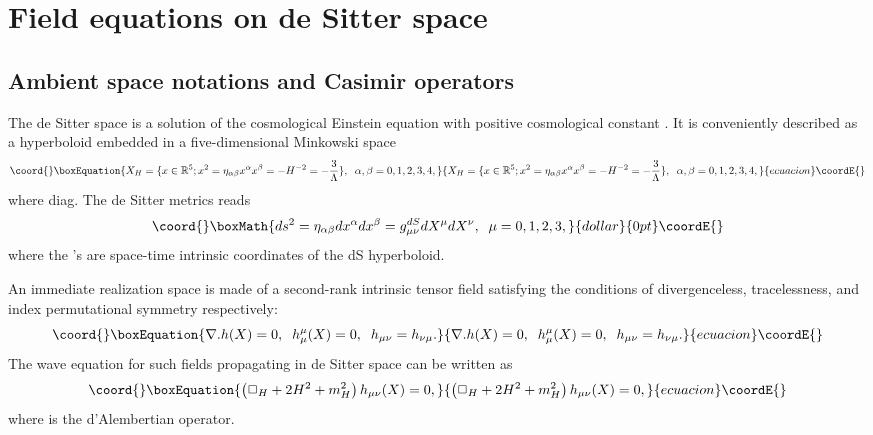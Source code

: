 \documentclass[a4paper,11pt,showpacs,preprintnumbers]{revtex4}
\def\setR{\mathbb{R}}
\begin{document}
\section{Field equations on de Sitter space}
\subsection{Ambient space notations and Casimir operators}
The de Sitter space is a solution of the cosmological Einstein
equation with positive cosmological constant \myHighlight{$\Lambda$}\coordHE{}. It is
conveniently described as a hyperboloid embedded in a
five-dimensional Minkowski space
\begin{equation}\coord{}\boxEquation{
X_H=\{x \in \setR^5 ;x^2=\eta_{\alpha\beta} x^\alpha x^\beta
=-H^{-2}=-\frac{3}{\Lambda}\},\;\;\alpha,\beta=0,1,2,3,4,
}{
X_H=\{x \in \setR^5 ;x^2=\eta_{\alpha\beta} x^\alpha x^\beta
=-H^{-2}=-\frac{3}{\Lambda}\},\;\;\alpha,\beta=0,1,2,3,4,
}{ecuacion}\coordE{}\end{equation}
where \myHighlight{$\eta_{\alpha\beta}=$}\coordHE{} diag\coordHE{}. The de Sitter
metrics reads
$$\coord{}\boxMath{ds^2=\eta_{\alpha\beta}dx^{\alpha}dx^{\beta}=g_{\mu\nu}^{dS}dX^{\mu}dX^{\nu},\;\;\mu=0,1,2,3,}{dollar}{0pt}\coordE{}$$
where the \coordHE{}'s are  \coordHE{} space-time intrinsic coordinates of
the dS hyperboloid.

An immediate  realization space is made of a second-rank intrinsic
tensor field \coordHE{} satisfying the conditions of
divergenceless, tracelessness, and index permutational symmetry
respectively:
\begin{equation}\coord{}\boxEquation{
\nabla.h(X)=0,\;\;h_{\mu}^{\mu}(X)=0,\;\;h_{\mu\nu}=h_{\nu\mu}.
\label{eq:con1}
}{
\nabla.h(X)=0,\;\;h_{\mu}^{\mu}(X)=0,\;\;h_{\mu\nu}=h_{\nu\mu}.
}{ecuacion}\coordE{}\end{equation}
The wave equation for such fields propagating in de Sitter space
can be written as \cite{gasp}
\begin{equation}\coord{}\boxEquation{\label{eq:wav}
\left(\Box_H +2H^2+m_H^2\right) h_{\mu\nu}(X)=0,
}{\left(\Box_H +2H^2+m_H^2\right) h_{\mu\nu}(X)=0,
}{ecuacion}\coordE{}\end{equation}
where \coordHE{} is the d'Alembertian
operator.
\end{document}
